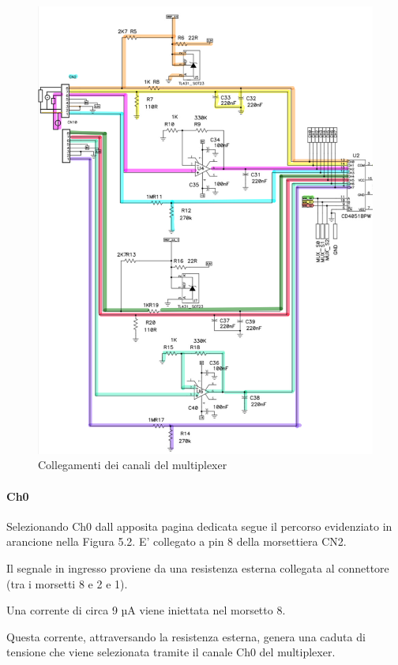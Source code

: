 \documentclass[12pt,a4paper]{report}
\begin{document}
\begin{figure}[H]
    \centering
    \includegraphics[width=\linewidth]{../image/channelMultiplex.png}
    \caption{Collegamenti dei canali del multiplexer}
\end{figure}

\paragraph{Ch0}
Selezionando Ch0 dall apposita pagina dedicata segue il percorso evidenziato in arancione nella Figura 5.2.
E' collegato a pin 8 della morsettiera CN2.

Il segnale in ingresso proviene da una resistenza esterna collegata al connettore (tra i morsetti 8 e 2 e 1). 

Una corrente di circa 9 µA viene iniettata nel morsetto 8. 

Questa corrente, attraversando la resistenza esterna, genera una caduta di tensione che viene selezionata tramite il canale Ch0 del multiplexer. 
\end{document}
